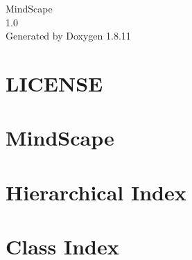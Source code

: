 \documentclass[twoside]{book}
\newcommand{\+}{\discretionary{\mbox{\scriptsize$\hookleftarrow$}}{}{}}
\newcommand{\clearemptydoublepage}{%
  \newpage{\pagestyle{empty}\cleardoublepage}%
}
\begin{document}
\hypersetup{pageanchor=false,
             bookmarksnumbered=true,
             pdfencoding=unicode
            }
\begin{titlepage}
\vspace*{7cm}
\begin{center}%
{\Large Mind\+Scape \\[1ex]\large 1.\+0 }\\
\vspace*{1cm}
{\large Generated by Doxygen 1.8.11}\\
\end{center}
\end{titlepage}
\clearemptydoublepage
\tableofcontents
\clearemptydoublepage
{}
\hypersetup{pageanchor=true}

\chapter{L\+I\+C\+E\+N\+SE}
\label{md_LICENSE}
\hypertarget{md_LICENSE}{}

\chapter{Mind\+Scape}
\label{md_README}
\hypertarget{md_README}{}

\chapter{Hierarchical Index}

\chapter{Class Index}

\end{document}
